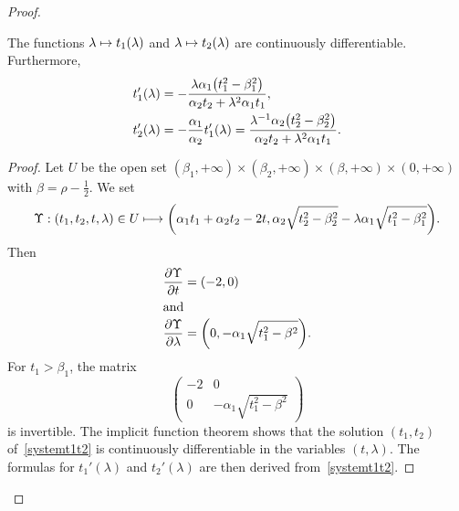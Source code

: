 \documentclass[AHL,Unicode,longabstracts]{cedram}
\let\originalleft\left
\let\originalright\right
\renewcommand{\left}{\mathopen{}\mathclose\bgroup\originalleft}
\renewcommand{\right}{\aftergroup\egroup\originalright}
\let\oldin\in
\renewcommand{\in}{\mathchoice{\oldin}{\oldin}{\,\oldin\,}{\,\oldin\,}}
\let\oldmapsto\mapsto
\renewcommand*{\mapsto}{\mathchoice{\longmapsto}{\oldmapsto}{\oldmapsto}{\oldmapsto}}
\begin{document}
\begin{proof}
\begin{lemm}\label{t1t2deriviative}
The functions $\lambda \mapsto t_1(\lambda)$ and $\lambda \mapsto t_2(\lambda)$ are continuously differentiable. Furthermore,
\begin{align*}
t_1'(\lambda) &= - \frac{\lambda \alpha_1\left(t_1^2 - \beta_1^2\right)}{\alpha_2 t_2 + \lambda^2 \alpha_1 t_1}, \\
t_2'(\lambda) &= - \frac{\alpha_1}{\alpha_2} t_1'(\lambda) = \frac{\lambda^{-1} \alpha_2 \left(t_2^2 - \beta_2^2 \right)}{\alpha_2 t_2 + \lambda^2 \alpha_1 t_1}.
\end{align*}
\end{lemm}

\begin{proof}
Let $U$ be the open set $(\beta_1,+\infty)\times (\beta_2,+\infty)\times (\beta,+\infty)\times (0,+\infty)$ with $\beta = \rho - \frac{1}{2}$. We set
\[
\Upsilon:(t_1,t_2,t,\lambda)\in U\mapsto \left(\alpha_1 t_1 + \alpha_2 t_2-2t, \alpha_2 \sqrt{t_2^2 - \beta_2^2}- \lambda \alpha_1 \sqrt{t_1^2 - \beta_1^2}\right).
\]
Then
\begin{align*}
\frac{\partial \Upsilon}{\partial t}&=(-2,0)
\\
\intertext{and}
\frac{\partial \Upsilon}{\partial \lambda}&=\left(0,- \alpha_1 \sqrt{t_1^2-\beta^2}\right).
\end{align*}
For $t_1>\beta_1$, the matrix
\[
\begin{pmatrix}
-2&0\\
0&- \alpha_1 \sqrt{t_1^2-\beta^2}
\end{pmatrix}
\]
is invertible. The implicit function theorem shows that the solution $(t_1,t_2)$ of~\eqref{systemt1t2} is continuously differentiable in the variables $(t,\lambda)$. The formulas for $t_1'(\lambda)$ and $t_2'(\lambda)$ are then derived from~\eqref{systemt1t2}.
\end{proof}


\end{proof}
\end{document}
